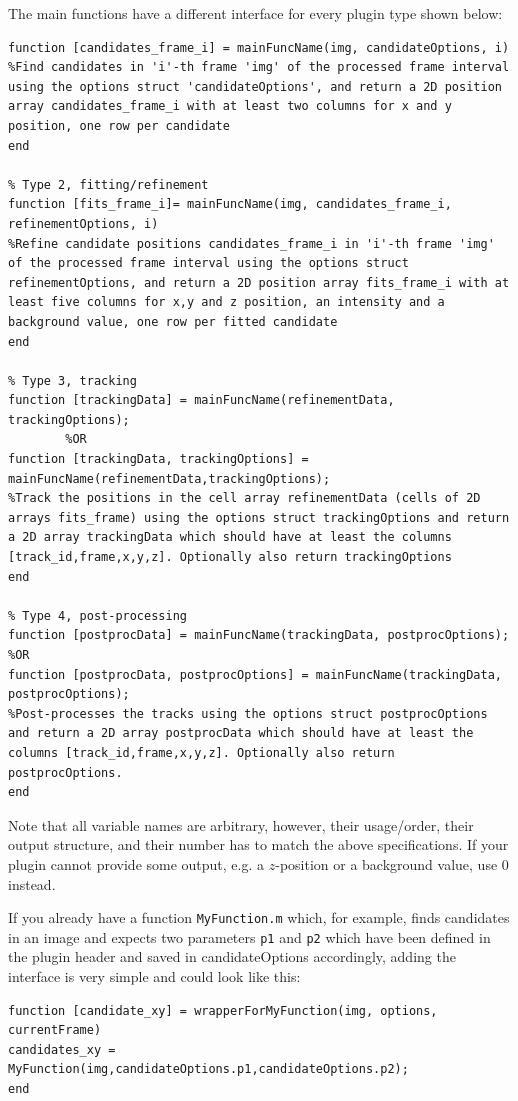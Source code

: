 \documentclass[11pt,onside]{report}
\numberwithin{equation}{chapter}
\begin{document}
The main functions have a different interface for every plugin type shown below:
\begin{lstlisting}[style=Matlab-editor]
% Type 1, candidate detection
function [candidates_frame_i] = mainFuncName(img, candidateOptions, i)
%Find candidates in 'i'-th frame 'img' of the processed frame interval using the options struct 'candidateOptions', and return a 2D position array candidates_frame_i with at least two columns for x and y position, one row per candidate
end
  
% Type 2, fitting/refinement
function [fits_frame_i]= mainFuncName(img, candidates_frame_i, refinementOptions, i)
%Refine candidate positions candidates_frame_i in 'i'-th frame 'img' of the processed frame interval using the options struct refinementOptions, and return a 2D position array fits_frame_i with at least five columns for x,y and z position, an intensity and a background value, one row per fitted candidate
end

% Type 3, tracking
function [trackingData] = mainFuncName(refinementData, trackingOptions);
        %OR
function [trackingData, trackingOptions] = mainFuncName(refinementData,trackingOptions);
%Track the positions in the cell array refinementData (cells of 2D arrays fits_frame) using the options struct trackingOptions and return a 2D array trackingData which should have at least the columns [track_id,frame,x,y,z]. Optionally also return trackingOptions
end

% Type 4, post-processing
function [postprocData] = mainFuncName(trackingData, postprocOptions);
%OR
function [postprocData, postprocOptions] = mainFuncName(trackingData, postprocOptions);
%Post-processes the tracks using the options struct postprocOptions and return a 2D array postprocData which should have at least the columns [track_id,frame,x,y,z]. Optionally also return postprocOptions.
end
\end{lstlisting}
Note that all variable names are arbitrary, however, their usage/order, their output structure, and their number has to match the above specifications. If your plugin cannot provide some output, e.g. a $z$-position or a background value, use 0 instead. 

If you already have a function \texttt{MyFunction.m} which, for example, finds candidates in an image and expects two parameters \texttt{p1} and \texttt{p2} which have been defined in the plugin header and saved in candidateOptions accordingly, adding the interface is very simple and could look like this:
\begin{lstlisting}[style=Matlab-editor]
function [candidate_xy] = wrapperForMyFunction(img, options, currentFrame)
candidates_xy = MyFunction(img,candidateOptions.p1,candidateOptions.p2);
end
\end{lstlisting}
\end{document}
